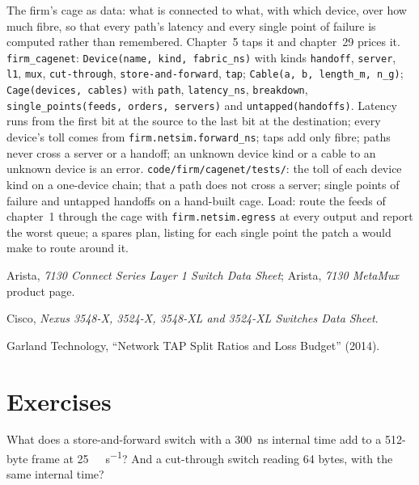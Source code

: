 \begin{build}
 The firm's cage as data: what is connected to what, with which device, over how much fibre, so that every path's
latency and every single point of failure is computed rather than remembered. Chapter~5 taps it and chapter~29 prices it.
 \texttt{firm\_cagenet}: \texttt{Device(name, kind, fabric\_ns)} with kinds \texttt{handoff}, \texttt{server},
\texttt{l1}, \texttt{mux}, \texttt{cut-through}, \texttt{store-and-forward}, \texttt{tap}; \texttt{Cable(a, b, length\_m, n\_g)};
\texttt{Cage(devices, cables)} with \texttt{path}, \texttt{latency\_ns}, \texttt{breakdown}, \texttt{single\_points(feeds, orders,
servers)} and \texttt{untapped(handoffs)}.
 Latency runs from the first bit at the source to the last bit at the destination; every device's toll comes from
\texttt{firm.netsim.forward\_ns}; taps add only fibre; paths never cross a server or a handoff; an unknown device kind or a cable to
an unknown device is an error.
 \texttt{code/firm/cagenet/tests/}: the toll of each device kind on a one-device chain; that a path does not
cross a server; single points of failure and untapped handoffs on a hand-built cage.
 Load: route the feeds of chapter~1 through the cage with \texttt{firm.netsim.egress} at every output and report the
worst queue; a spares plan, listing for each single point the patch a  would make to route around it.
\end{build}

\begin{omsources}
\item Arista, \emph{7130 Connect Series Layer 1 Switch Data Sheet}; Arista, \emph{7130 MetaMux} product page.
\item Cisco, \emph{Nexus 3548-X, 3524-X, 3548-XL and 3524-XL Switches Data Sheet}.
\item Garland Technology, ``Network TAP Split Ratios and Loss Budget'' (2014).
\end{omsources}

\section{Exercises}

\begin{exercise}[$\star$]\label{exo:nw:switches-and-layer-1-devices:1}
What does a store-and-forward switch with a \qty{300}{\nano\second} internal time add to a 512-byte frame at
\qty{25}{\giga\bit\per\second}? And a cut-through switch reading 64 bytes, with the same internal time?
\end{exercise}

